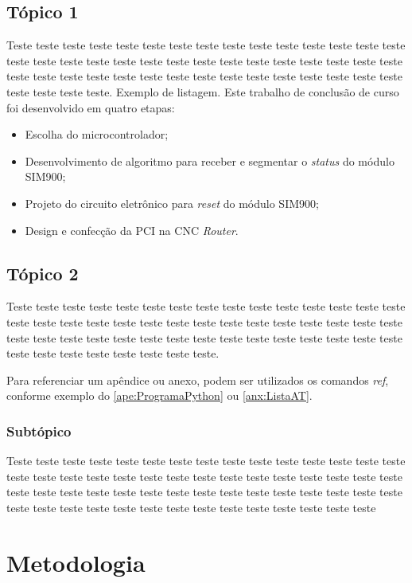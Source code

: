 \documentclass[12pt]{article}
\begin{document}
  \subsection{Tópico 1}

  Teste teste teste teste teste teste teste teste teste teste teste teste teste teste teste teste teste teste teste teste teste teste teste teste teste teste teste teste teste teste teste teste teste teste teste teste teste teste teste teste teste teste teste teste teste teste teste teste teste. Exemplo de listagem. Este trabalho de conclusão de curso foi desenvolvido em quatro etapas:
\begin{itemize}
\item Escolha do microcontrolador;
\item Desenvolvimento de algoritmo para receber e segmentar o \textit{status} do módulo SIM900;
\item Projeto do circuito eletrônico para \textit{reset} do módulo SIM900;
\item Design e confecção da PCI na CNC \textit{Router}.
\end{itemize}

  \subsection{Tópico 2}

 Teste teste teste teste teste teste teste teste teste teste teste teste teste teste teste teste teste teste teste teste teste teste teste teste teste teste teste teste teste teste teste teste teste teste teste teste teste teste teste teste teste teste teste teste teste teste teste teste teste teste teste teste teste.
 
 Para referenciar um apêndice ou anexo, podem ser utilizados os comandos \textit{ref}, conforme exemplo do \ref{ape:ProgramaPython} ou \ref{anx:ListaAT}.

 \subsubsection{Subtópico}

  Teste teste teste teste teste teste teste teste teste teste teste teste teste teste teste teste teste teste teste teste teste teste teste teste teste teste teste teste teste teste teste teste teste teste teste teste teste teste teste teste teste teste teste teste teste teste teste teste teste teste teste teste teste teste teste teste teste teste teste

\section{Metodologia}
\end{document}
